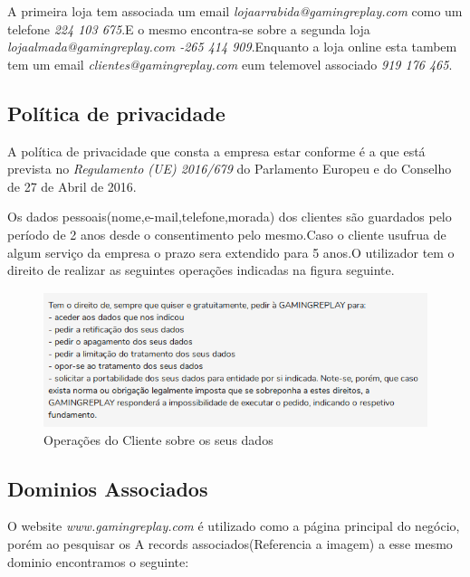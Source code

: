 A primeira loja tem associada um email \emph{lojaarrabida@gamingreplay.com}
como um telefone \emph{224 103 675}.E o mesmo encontra-se sobre a segunda loja \emph{lojaalmada@gamingreplay.com -265 414 909}.Enquanto a loja online esta tambem tem um email \emph{clientes@gamingreplay.com} eum telemovel associado \emph{919 176 465}.

\subsection{Política de privacidade}

A política de privacidade que consta a empresa estar conforme é a que está prevista no \emph{Regulamento (UE) 2016/679} do Parlamento Europeu e do Conselho de 27 de Abril de 2016.

Os dados pessoais(nome,e-mail,telefone,morada) dos clientes são guardados pelo período de 2 anos desde o consentimento pelo mesmo.Caso o cliente usufrua de algum serviço da empresa o prazo sera extendido para 5 anos.O utilizador tem o direito de realizar as seguintes operações indicadas na figura seguinte.

\begin{figure}[h!]
\caption{Operações do Cliente sobre os seus dados}
\includegraphics{Images/OperCliente.png}
\end{figure}

\subsection{Dominios Associados}

O website \emph{www.gamingreplay.com} é utilizado como a página principal do negócio, porém ao pesquisar os A records associados(Referencia a imagem) a esse mesmo dominio encontramos o seguinte:


